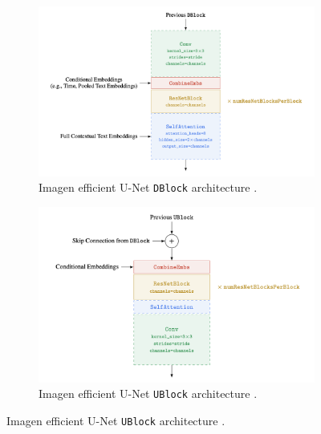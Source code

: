 \begin{figure}
    \centering
    \begin{subfigure}[b]{0.5\textwidth}   
        \centering 
        \includegraphics[width=\textwidth]{images/appendix/imagen/dblock.png}
        \caption[]%
        {{\small Imagen efficient U-Net \texttt{DBlock} architecture \cite{imagen}.}}
    \end{subfigure}
    \hfill
    \begin{subfigure}[b]{0.475\textwidth}
        \centering
        \includegraphics[width=\textwidth]{images/appendix/imagen/ublock.png}
        \caption[]%
        {{\small Imagen efficient U-Net \texttt{UBlock} architecture \cite{imagen}.}}
    \end{subfigure}
\end{figure}















